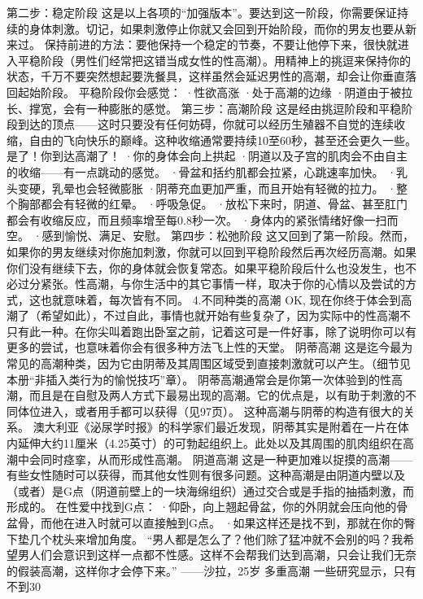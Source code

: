 \documentclass[12pt,UTF8,openany]{ctexbook}
\begin{document}
第二步：稳定阶段
这是以上各项的“加强版本”。要达到这一阶段，你需要保证持续的身体刺激。切记，如果刺激停止你就又会回到开始阶段，而你的男友也要从新来过。
保持前进的方法：要他保持一个稳定的节奏，不要让他停下来，很快就进入平稳阶段（男性们经常把这错当成女性的性高潮）。用精神上的挑逗来保持你的状态，千万不要突然想起要洗餐具，这样虽然会延迟男性的高潮，却会让你垂直落回起始阶段。
平稳阶段你会感觉：
·性欲高涨
·处于高潮的边缘
·阴道由于被拉长、撑宽，会有一种膨胀的感觉。
第三步：高潮阶段
这是经由挑逗阶段和平稳阶段到达的顶点——这时只要没有任何妨碍，你就可以经历生殖器不自觉的连续收缩，自由的飞向快乐的巅峰。这种收缩通常要持续10至60秒，甚至还会更久一些。
是了！你到达高潮了！
·你的身体会向上拱起
·阴道以及子宫的肌肉会不由自主的收缩——有一点跳动的感觉。
·骨盆和括约肌都会拉紧，心跳速率加快。
·乳头变硬，乳晕也会轻微膨胀
·阴蒂充血更加严重，而且开始有轻微的拉力。
·整个胸部都会有轻微的红晕。
·呼吸急促。
·放松下来时，阴道、骨盆、甚至肛门都会有收缩反应，而且频率增至每0.8秒一次。
·身体内的紧张情绪好像一扫而空。
·感到愉悦、满足、安慰。
第四步：松弛阶段
这又回到了第一阶段。然而，如果你的男友继续对你施加刺激，你就可以回到平稳阶段然后再次经历高潮。如果你们没有继续下去，你的身体就会恢复常态。如果平稳阶段后什么也没发生，也不必过分紧张。性高潮，与你生活中的其它事情一样，取决于你的心情以及尝试的方式，这也就意味着，每次皆有不同。
4.不同种类的高潮
OK, 现在你终于体会到高潮了（希望如此），不过自此，事情也就开始有些复杂了，因为实际中的性高潮不只有此一种。在你尖叫着跑出卧室之前，记着这可是一件好事，除了说明你可以有更多的尝试，也意味着你会有很多种方法飞上性的天堂。
阴蒂高潮
这是迄今最为常见的高潮种类，因为它由阴蒂及其周围区域受到直接刺激就可以产生。（细节见本册“非插入类行为的愉悦技巧”章）。
阴蒂高潮通常会是你第一次体验到的性高潮，而且是在自慰及两人方式下最易出现的高潮。它的优点是，以有助于刺激的不同体位进入，或者用手都可以获得（见97页）。
这种高潮与阴蒂的构造有很大的关系。
澳大利亚《泌尿学时报》的科学家们最近发现，阴蒂其实是附着在一片在体内延伸大约11厘米（4.25英寸）的可勃起组织上。此处以及其周围的肌肉组织在高潮中会同时痉挛，从而形成性高潮。
阴道高潮
这是一种更加难以捉摸的高潮——有些女性随时可以获得，而其他女性则有很多问题。这种高潮是由阴道内壁以及（或者）是G点（阴道前壁上的一块海绵组织）通过交合或是手指的抽插刺激，而形成的。
在性爱中找到G点：
·仰卧，向上翘起骨盆，你的外阴就会压向他的骨盆骨，而他在进入时就可以直接触到G点。
·如果这样还是找不到，那就在你的臀下垫几个枕头来增加角度。
“男人都是怎么了？他们除了猛冲就不会别的吗？我希望男人们会意识到这样一点都不性感。这样不会帮我们达到高潮，只会让我们无奈的假装高潮，这样你才会停下来。”
——沙拉，25岁
多重高潮
一些研究显示，只有不到30%
\end{document}
